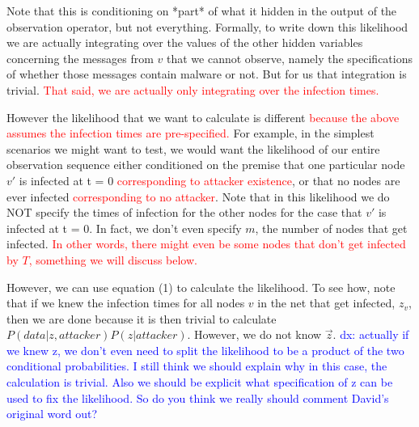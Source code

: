 \documentclass{article}
\begin{document}
	Note that this is conditioning on *part* of what it hidden in the
	output of the observation operator, but not everything.  Formally, to
	write down this likelihood we are actually integrating over the values
	of the other hidden variables concerning the messages from $v$ that we
	cannot observe, namely the specifications of whether those messages
	contain malware or not. But for us that integration is trivial. 
	\textcolor{red}{That said, we are actually only integrating over the infection
	times.}

	However the likelihood that we want to calculate is different 
	\textcolor{red}{because the above assumes the infection times are pre-specified.} 
        For example, in the simplest scenarios we might want
	to test, we would want the likelihood of our entire observation
	sequence either conditioned on the premise that one particular node
	$v'$ is infected at t = 0 \textcolor{red}{corresponding to attacker existence}, or that
	no nodes are ever infected \textcolor{red}{corresponding to no attacker}. Note
	that in this likelihood we do NOT specify the times of infection for
	the other nodes for the case that $v'$ is infected at t = 0. In fact,
	we don't even specify $m$, the number of nodes that get infected. 
	\textcolor{red}{In other words, there might even be some nodes that don't get 
        infected by $T$, something we will discuss below.}

	
	However, we can use equation (1) to calculate the likelihood. To see how, note that
        if we knew the infection times for all nodes $v$ in the net that get infected, 
        $z_{v}$, then we are done because it is then trivial to calculate \\
        $P(data | z, attacker)P(z |attacker)$. %
        However, we do not know $\vec{z}$. 
        \textcolor{blue}{dx: actually if we knew z, we don't even need to split the likelihood
        to be a product of the two conditional probabilities. I still think we should explain why
        in this case, the calculation is trivial. Also we should be explicit what specification of z
        can be used to fix the likelihood. So do you think we really should comment David's 
        original word out?}
	
\end{document}
